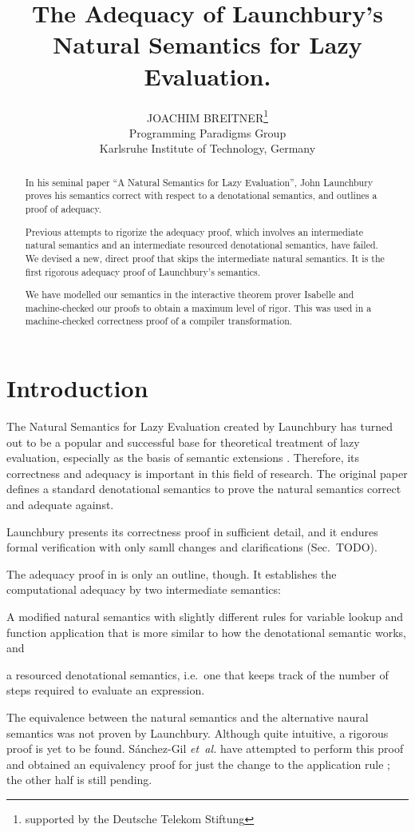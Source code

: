 \documentclass{jfp1}
\title[The Adequacy of Launchbury's Semantics]
      {The Adequacy of Launchbury's\\ Natural Semantics for Lazy Evaluation.}
\author[J. Breitner]
        {JOACHIM BREITNER\thanks{supported by the Deutsche Telekom Stiftung}\\
	Programming Paradigms Group\\
         Karlsruhe Institute of Technology, Germany\\
         \email{breitner@kit.edu}}
\theoremstyle{nonumberbreak}
\begin{document}
\label{firstpage}

\maketitle

\begin{abstract}
In his seminal paper “A Natural Semantics for Lazy Evaluation”, John Launchbury
proves his semantics correct with respect to a denotational semantics, and outlines a proof of adequacy.

Previous attempts to rigorize the adequacy proof, which involves an intermediate natural semantics and an intermediate resourced denotational semantics, have failed. We devised a new, direct proof that skips the intermediate natural semantics. It is the first rigorous adequacy proof of Launchbury’s semantics.

We have modelled our semantics in the interactive theorem prover Isabelle and machine-checked our proofs to obtain a maximum level of rigor. This was used in a machine-checked correctness proof of a compiler transformation.
\end{abstract}


\section{Introduction}

The Natural Semantics for Lazy Evaluation created by Launchbury  has turned out to be a popular and successful base for theoretical treatment of lazy evaluation, especially as the basis of semantic extensions \cite{nakata, nakata_blackhole, distributed, mixed, parallel}. Therefore, its correctness and adequacy is important in this field of research. The original paper defines a standard denotational semantics to prove the natural semantics correct and adequate against.

Launchbury presents its correctness proof in sufficient detail, and it endures formal verification with only samll changes and clarifications (Sec.~TODO).

The adequacy proof in \cite{launchbury} is only an outline, though. It establishes the computational adequacy by two intermediate semantics:
\begin{compactitem}
\item A modified natural semantics with slightly different rules for variable lookup and function application that is more similar to how the denotational semantic works, and
\item a resourced denotational semantics, i.e.~one that keeps track of the number of steps required to evaluate an expression.
\end{compactitem}
The equivalence between the natural semantics and the alternative naural semantics was not proven by Launchbury. Although quite intuitive, a rigorous proof is yet to be found. S{\'a}nchez-Gil {\em et~al.} have attempted to perform this proof and obtained an equivalency proof for just the change to the application rule ; the other half is still pending.
\end{document}
